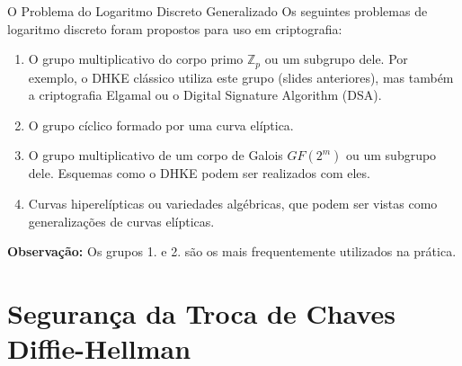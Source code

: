 \documentclass{beamer}
\begin{document}
\begin{frame}{O Problema do Logaritmo Discreto Generalizado}
    \small %
    Os seguintes problemas de logaritmo discreto foram propostos para uso em criptografia:

    \begin{enumerate}
        \item O grupo multiplicativo do corpo primo $\mathbb{Z}_p$ ou um subgrupo dele. Por exemplo, o DHKE clássico utiliza este grupo (slides anteriores), mas também a criptografia Elgamal ou o Digital Signature Algorithm (DSA).
        \vspace{0.5em}
        \item O grupo cíclico formado por uma curva elíptica.
        \vspace{0.5em}
        \item O grupo multiplicativo de um corpo de Galois $GF(2^m)$ ou um subgrupo dele. Esquemas como o DHKE podem ser realizados com eles.
        \vspace{0.5em}
        \item Curvas hiperelípticas ou variedades algébricas, que podem ser vistas como generalizações de curvas elípticas.
    \end{enumerate}

    \vspace{1em}
    \textbf{Observação:} Os grupos 1. e 2. são os mais frequentemente utilizados na prática.
\end{frame}

\section{Segurança da Troca de Chaves Diffie-Hellman}
\end{document}
